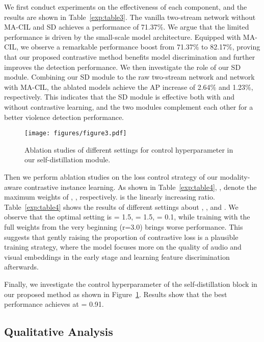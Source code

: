 \documentclass[sigconf]{acmart}
\begin{document}
We first conduct experiments on the effectiveness of each component, and the results are shown in Table~\ref{exp:table3}. The vanilla two-stream network without MA-CIL and SD achieves a performance of 71.37\%. We argue that the limited performance is driven by the small-scale model architecture. Equipped with MA-CIL, we observe a remarkable performance boost from 71.37\% to 82.17\%, proving that our proposed contrastive method benefits model discrimination and further improves the detection performance. We then investigate the role of our SD module. Combining our SD module to the raw two-stream network and network with MA-CIL, the ablated models achieve the AP increase of 2.64\% and 1.23\%, respectively. This indicates that the SD module is effective both with and without contrastive learning, and the two modules complement each other for a better violence detection performance.

\begin{figure}[tb]
\centering
\texttt{[image: figures/figure3.pdf]}
\vspace{-2mm}
\caption{Ablation studies of different settings for control hyperparameter  in our self-distillation module.}
\vspace{-2mm}
\label{figure3}
\end{figure}

Then we perform ablation studies on the loss control strategy of our modality-aware contrastive instance learning. As shown in Table~\ref{exp:table4}, ,  denote the maximum weights of , , respectively.  is the linearly increasing ratio. Table~\ref{exp:table4} shows the results of different settings about , , and . We observe that the optimal setting is  = 1.5,  = 1.5,  = 0.1, while training with the full weights from the very beginning (r=3.0) brings worse performance. This suggests that gently raising the proportion of contrastive loss is a plausible training strategy, where the model focuses more on the quality of audio and visual embeddings in the early stage and learning feature discrimination afterwards.

Finally, we investigate the control hyperparameter  of the self-distillation block in our proposed method as shown in Figure~\ref{figure3}. Results show that the best performance achieves at  = 0.91.

\subsection{Qualitative Analysis}
\end{document}
